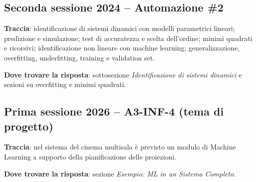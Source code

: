 \subsection*{Seconda sessione 2024 -- Automazione \#2}
\textbf{Traccia}: identificazione di sistemi dinamici con modelli parametrici lineari; predizione e simulazione; test di accuratezza e scelta dell'ordine; minimi quadrati e ricorsivi; identificazione non lineare con machine learning; generalizzazione, overfitting, underfitting, training e validation set.

\textbf{Dove trovare la risposta}: sottosezione \emph{Identificazione di sistemi dinamici} e sezioni su overfitting e minimi quadrati.

\subsection*{Prima sessione 2026 -- A3-INF-4 (tema di progetto)}
\textbf{Traccia}: nel sistema del cinema multisala è previsto un modulo di Machine Learning a supporto della pianificazione delle proiezioni.

\textbf{Dove trovare la risposta}: sezione \emph{Esempio: ML in un Sistema Completo}.
